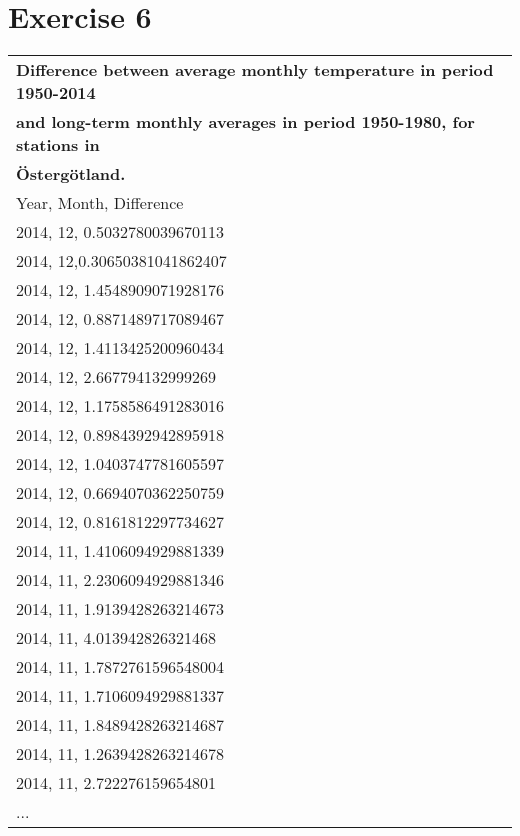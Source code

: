 \documentclass[a4paper,titlepage,12pt]{article}
\begin{document}
\section{Exercise 6}
\begin{tabular}{l}
  \bf Difference between average monthly temperature in period 1950-2014 \\
  \bf and long-term monthly averages in period 1950-1980, for stations in \\
  \bf Östergötland. \\ 
  Year, Month, Difference \\
  \hline
  2014,   12, 0.5032780039670113 \\ 
  2014,   12,0.30650381041862407 \\ 
  2014,   12, 1.4548909071928176 \\
  2014,   12, 0.8871489717089467 \\
  2014,   12, 1.4113425200960434 \\
  2014,   12,  2.667794132999269 \\
  2014,   12, 1.1758586491283016 \\
  2014,   12, 0.8984392942895918 \\
  2014,   12, 1.0403747781605597 \\
  2014,   12, 0.6694070362250759 \\
  2014,   12, 0.8161812297734627 \\
  2014,   11, 1.4106094929881339 \\
  2014,   11, 2.2306094929881346 \\
  2014,   11, 1.9139428263214673 \\
  2014,   11,  4.013942826321468 \\
  2014,   11, 1.7872761596548004 \\
  2014,   11, 1.7106094929881337 \\
  2014,   11, 1.8489428263214687 \\
  2014,   11, 1.2639428263214678 \\
  2014,   11,  2.722276159654801 \\
  ... \\
\end{tabular}
\end{document}
